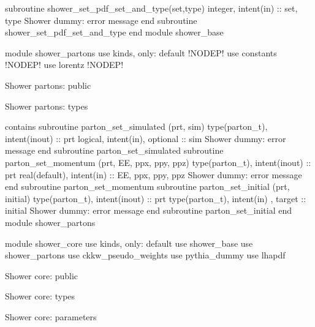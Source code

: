   subroutine shower_set_pdf_set_and_type(set,type)
    integer, intent(in) :: set, type
    \LA{}Shower dummy: error message\RA{}
  end subroutine shower_set_pdf_set_and_type
end module shower_base

module shower_partons
  use kinds, only: default !NODEP!
  use constants !NODEP!
  use lorentz !NODEP!

\LA{}Shower partons: public\RA{}

\LA{}Shower partons: types\RA{}

contains
  subroutine parton_set_simulated (prt, sim)
    type(parton_t), intent(inout) :: prt
    logical, intent(in), optional :: sim
    \LA{}Shower dummy: error message\RA{}
  end subroutine parton_set_simulated
  subroutine parton_set_momentum (prt, EE, ppx, ppy, ppz)
    type(parton_t), intent(inout) :: prt
    real(default), intent(in) :: EE, ppx, ppy, ppz
    \LA{}Shower dummy: error message\RA{}
  end subroutine parton_set_momentum
  subroutine parton_set_initial (prt, initial)
    type(parton_t), intent(inout) :: prt
    type(parton_t), intent(in) , target :: initial
    \LA{}Shower dummy: error message\RA{}
  end subroutine parton_set_initial
end module shower_partons

module shower_core
  use kinds, only: default
  use shower_base
  use shower_partons
  use ckkw_pseudo_weights
  use pythia_dummy
  use lhapdf

\LA{}Shower core: public\RA{}

\LA{}Shower core: types\RA{}

\LA{}Shower core: parameters\RA{}

